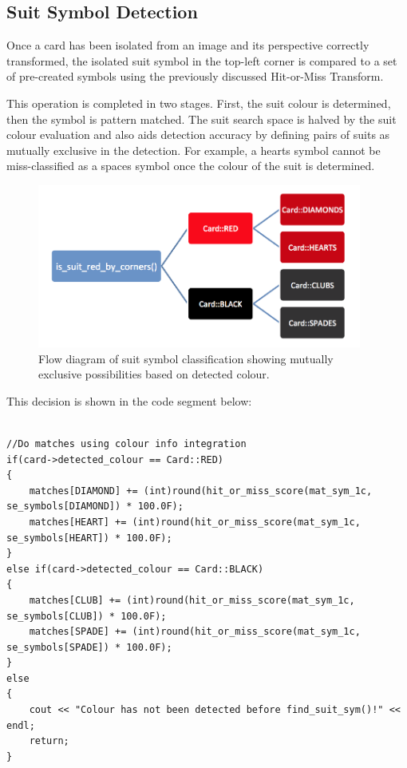 \documentclass[a4paper,12pt,notitlepage]{article}
\begin{document}
	\subsection{Suit Symbol Detection}
		Once a card has been isolated from an image and its perspective correctly transformed, the isolated suit symbol in the top-left corner is compared to a set of pre-created symbols using the previously discussed Hit-or-Miss Transform.

		This operation is completed in two stages. First, the suit colour is determined, then the symbol is pattern matched. The suit search space is halved by the suit colour evaluation and also aids detection accuracy by defining pairs of suits as mutually exclusive in the detection. For example, a hearts symbol cannot be miss-classified as a spaces symbol once the colour of the suit is determined.

		\begin{figure}[H]
			\centering
			\includegraphics[width=0.95\textwidth]{chris/image38}
			\caption{Flow diagram of suit symbol classification showing mutually exclusive possibilities based on detected colour.}
		\end{figure}

		This decision is shown in the code segment below:

		\begin{lstlisting}

//Do matches using colour info integration
if(card->detected_colour == Card::RED)
{
    matches[DIAMOND] += (int)round(hit_or_miss_score(mat_sym_1c, se_symbols[DIAMOND]) * 100.0F);
    matches[HEART] += (int)round(hit_or_miss_score(mat_sym_1c, se_symbols[HEART]) * 100.0F);
}
else if(card->detected_colour == Card::BLACK)
{
    matches[CLUB] += (int)round(hit_or_miss_score(mat_sym_1c, se_symbols[CLUB]) * 100.0F);
    matches[SPADE] += (int)round(hit_or_miss_score(mat_sym_1c, se_symbols[SPADE]) * 100.0F);
}
else
{
    cout << "Colour has not been detected before find_suit_sym()!" << endl;
    return;
}
		\end{lstlisting}
\end{document}
